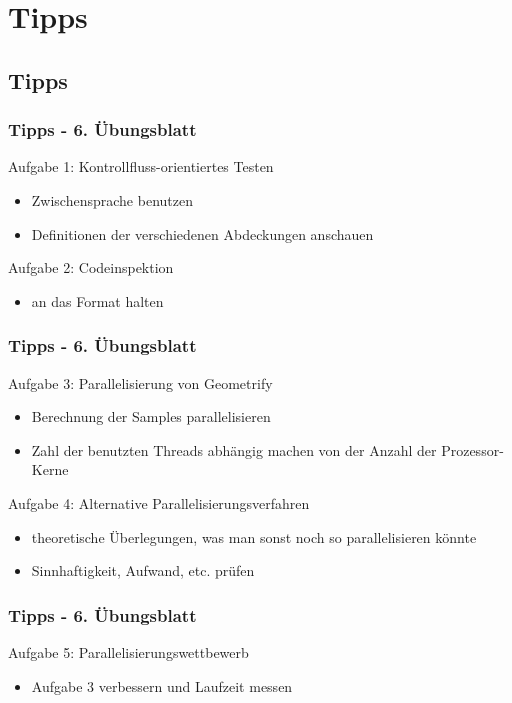 \documentclass[18pt]{beamer}
\begin{document}
\section{Tipps}
	\subsection{Tipps}
	\begin{frame}
		\frametitle{Tipps - 6. Übungsblatt}
		\begin{exampleblock}{Aufgabe 1: Kontrollfluss-orientiertes Testen}
			\begin{itemize}
				\item Zwischensprache benutzen
				\item Definitionen der verschiedenen Abdeckungen anschauen
			\end{itemize}
		\end{exampleblock}
		\pause
		\begin{exampleblock}{Aufgabe 2: Codeinspektion} 
			\begin{itemize}
				\item an das Format halten
			\end{itemize}
		\end{exampleblock}
	\end{frame}

	\begin{frame}
		\frametitle{Tipps - 6. Übungsblatt}
		\begin{exampleblock}{Aufgabe 3: Parallelisierung von Geometrify}
			\begin{itemize}
				\item Berechnung der Samples parallelisieren
				\item Zahl der benutzten Threads abhängig machen von der Anzahl der Prozessor-Kerne
			\end{itemize}
		\end{exampleblock}
		\pause
		\begin{exampleblock}{Aufgabe 4: Alternative Parallelisierungsverfahren}
			\begin{itemize}
				\item theoretische Überlegungen, was man sonst noch so parallelisieren könnte
				\item Sinnhaftigkeit, Aufwand, etc. prüfen
			\end{itemize}
		\end{exampleblock}
	\end{frame}

	\begin{frame}
		\frametitle{Tipps - 6. Übungsblatt}
		\begin{exampleblock}{Aufgabe 5: Parallelisierungswettbewerb}
			\begin{itemize}
				\item Aufgabe 3 verbessern und Laufzeit messen
			\end{itemize}
		\end{exampleblock}
	\end{frame}
\end{document}
